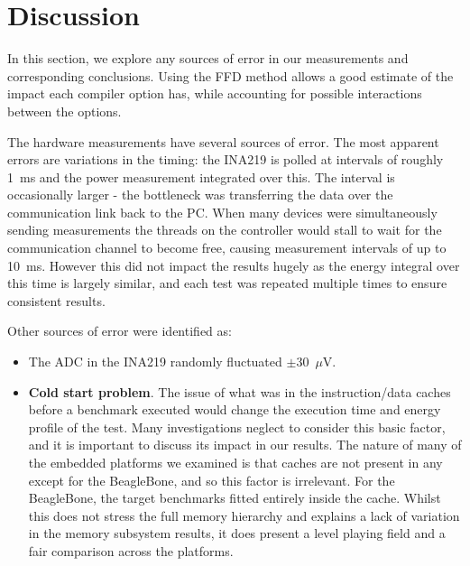 \documentclass[twocolumn]{article}
\begin{document}
\section{Discussion}

In this section, we explore any sources of error in our measurements and corresponding conclusions.
Using the FFD method allows a good estimate of the impact each compiler option has, while accounting for possible interactions between the options.

The hardware measurements have several sources of error. The most apparent errors are variations in the timing: the INA219 is polled at intervals of roughly 1~ms and the power measurement integrated over this. The interval is occasionally larger - the bottleneck was transferring the data over the communication link back to the PC. When many devices were simultaneously sending measurements the threads on the controller would stall to wait for the communication channel to become free, causing measurement intervals of up to 10~ms. However this did not impact the results hugely as the energy integral over this time is largely similar, and each test was repeated multiple times to ensure consistent results.

Other sources of error were identified as:
\begin{itemize}
	\item The ADC in the INA219 randomly fluctuated $\pm$30~$\mu$V.
	\item \textbf{Cold start problem}. The issue of what was in the instruction/data caches before a benchmark executed would change the execution time and energy profile of the test. Many investigations neglect to consider this basic factor, and it is important to discuss its impact in our results. The nature of many of the embedded platforms we examined is that caches are not present in any except for the BeagleBone, and so this factor is irrelevant. For the BeagleBone, the target benchmarks fitted entirely inside the cache. Whilst this does not stress the full memory hierarchy and explains a lack of variation in the memory subsystem results, it does present a level playing field and a fair comparison across the platforms.
\end{itemize}

\end{document}
